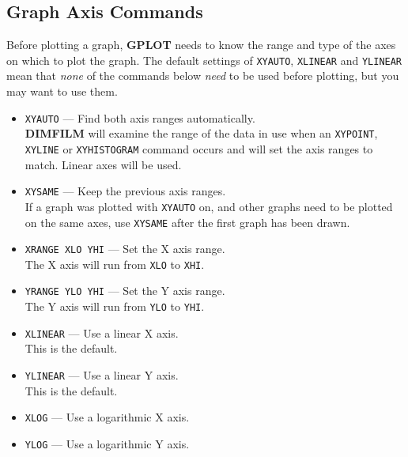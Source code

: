 \documentclass[a4paper,twoside,11pt]{article}
\newcommand{\textttc}[1]{\texttt{\textcolor{OurRed}{#1}}}
\begin{document}
\subsection{Graph Axis Commands}
Before plotting a graph, \textbf{GPLOT} needs to know the range and type of the axes on which
to plot the graph. The default settings of \texttt{XYAUTO}, \texttt{XLINEAR} 
and \texttt{YLINEAR} mean that \textit{none}
of the commands below \textit{need} to be used before plotting, but you may want to use them. 
\begin{itemize}
\item \textttc{XYAUTO} --- Find both axis ranges automatically.\\
   \textbf{DIMFILM} will examine the range of the data in use when an \texttt{XYPOINT}, 
   \texttt{XYLINE} or \texttt{XYHISTOGRAM}
   command occurs and will set the axis ranges to match. Linear axes will be used.
\item \textttc{XYSAME} --- Keep the previous axis ranges.\\
   If a graph was plotted with \texttt{XYAUTO} on, and other graphs need to be plotted on the same
   axes, use \texttt{XYSAME} after the first graph has been drawn. 
\item \textttc{XRANGE XLO YHI} --- Set the X axis range.\\
   The X axis will run from \texttt{XLO} to \texttt{XHI}.
\item \textttc{YRANGE YLO YHI} --- Set the Y axis range.\\
   The Y axis will run from \texttt{YLO} to \texttt{YHI}.
\item \textttc{XLINEAR} --- Use a linear X axis.\\
   This is the default.
\item \textttc{YLINEAR} --- Use a linear Y axis.\\
   This is the default.
\item \textttc{XLOG} --- Use a logarithmic X axis.
\item \textttc{YLOG} --- Use a logarithmic Y axis.
\end{itemize}
\end{document}
